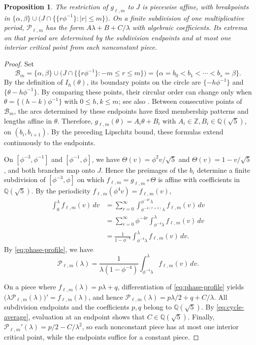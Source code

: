 \documentclass[11pt]{amsart}
\newtheorem{proposition}[theorem]{Proposition}
\theoremstyle{definition}
\begin{document}
\begin{proposition}\label{prop:finite-profile}
The restriction of $g_{\ell,m}$ to $J$ is piecewise affine, with
breakpoints in $\{\alpha,\beta\}\cup\bigl(J\cap\{\{r\phi^{-1}\}:|r|\leq m\}\bigr)$.
On a finite subdivision of one multiplicative period,
$\mathcal P_{\ell,m}$ has the form
$A\lambda+B+C/\lambda$ with algebraic coefficients. Its extrema on
that period are determined by the subdivision endpoints and at most
one interior critical point from each nonconstant piece.
\end{proposition}

\begin{proof}
Set
\[
\mathcal B_m=\{\alpha,\beta\}\cup
\bigl(J\cap\{\{r\phi^{-1}\}:-m\leq r\leq m\}\bigr)
=\{\alpha=b_0<b_1<\cdots<b_s=\beta\}.
\]
By the definition of $I_h(\theta)$, its boundary points on the circle
are $\{-h\phi^{-1}\}$ and $\{\theta-h\phi^{-1}\}$. By comparing these
points, their circular order can change only when $\theta=\{(h-k)\phi^{-1}\}$ with $0\leq h,k\leq m$;
see also \cite[\S2.1]{AlessandriBerthe}. Between consecutive points of
$\mathcal B_m$, the arcs determined by these endpoints have fixed
membership patterns and lengths affine in $\theta$. Therefore, $g_{\ell,m}(\theta)=A_i\theta+B_i$ with $A_i\in\mathbb Z, B_i\in\mathbb Q(\sqrt5)$,
on $(b_i,b_{i+1})$. By the preceding Lipschitz bound, these formulas
extend continuously to the endpoints.

On $[\phi^{-3},\phi^{-1}]$ and $[\phi^{-1},\phi]$, we have $\Theta(v)=\phi^2v/\sqrt5$ and $\Theta(v)=1-v/\sqrt5$,
and both branches map onto $J$. Hence the preimages of the $b_i$
determine a finite subdivision of $[\phi^{-3},\phi]$ on which
$f_{\ell,m}=g_{\ell,m}\circ\Theta$ is affine with coefficients in
$\mathbb Q(\sqrt5)$. By the periodicity
$f_{\ell,m}(\phi^4v)=f_{\ell,m}(v)$,
\[
\begin{aligned}
\int_0^\lambda f_{\ell,m}(v)\,dv
&=\sum_{r=0}^{\infty}
  \int_{\phi^{-4(r+1)}\lambda}^{\phi^{-4r}\lambda}
  f_{\ell,m}(v)\,dv\\
&=\sum_{r=0}^{\infty}\phi^{-4r}
  \int_{\phi^{-4}\lambda}^{\lambda}f_{\ell,m}(v)\,dv\\
&=\frac1{1-\phi^{-4}}
  \int_{\phi^{-4}\lambda}^{\lambda}f_{\ell,m}(v)\,dv.
\end{aligned}
\]
By \eqref{eq:phase-profile}, we have
\begin{equation}\label{eq:cycle-average}
\mathcal P_{\ell,m}(\lambda)
=\frac1{\lambda(1-\phi^{-4})}
\int_{\phi^{-4}\lambda}^{\lambda}f_{\ell,m}(v)\,dv.
\end{equation}

On a piece where $f_{\ell,m}(\lambda)=p\lambda+q$, differentiation of
\eqref{eq:phase-profile} yields $\bigl(\lambda\mathcal P_{\ell,m}(\lambda)\bigr)'=f_{\ell,m}(\lambda)$,
and hence $\mathcal P_{\ell,m}(\lambda)=p\lambda/2+q+C/\lambda$.
All subdivision endpoints and the coefficients $p,q$ belong to
$\mathbb Q(\sqrt5)$. By \eqref{eq:cycle-average}, evaluation at an
endpoint shows that $C\in\mathbb Q(\sqrt5)$. Finally, $\mathcal P_{\ell,m}'(\lambda)=p/2-C/\lambda^2$, so each nonconstant piece has at most one interior critical point, while the endpoints suffice for a constant piece.
\end{proof}
\end{document}
